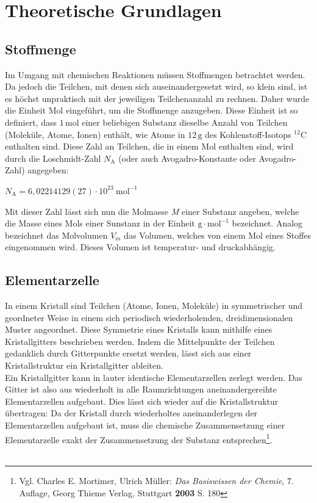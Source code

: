 \documentclass[12pt,a4paper,titlepage,headinclude,bibtotoc]{scrartcl}
\begin{document}
\tableofcontents

\newpage

\section{Theoretische Grundlagen}
\subsection{Stoffmenge}
Im Umgang mit chemischen Reaktionen müssen Stoffmengen betrachtet werden. Da jedoch die Teilchen, mit denen sich auseinandergesetzt wird, so klein sind, ist es höchst unpraktisch mit der jeweiligen Teilchenanzahl zu rechnen. Daher wurde die Einheit Mol eingeführt, um die Stoffmenge anzugeben. Diese Einheit ist so definiert, dass $ \mathrm{1\,mol}$ einer beliebigen Substanz dieselbe Anzahl von Teilchen (Moleküle, Atome, Ionen) enthält, wie Atome in $\mathrm{12\,g}$ des Kohlenstoff-Isotops $\mathrm{^{12}C}$ enthalten sind. Diese Zahl an Teilchen, die in einem Mol enthalten sind, wird durch die Loschmidt-Zahl $N_\mathrm{A}$ (oder auch Avogadro-Konstante oder Avogadro-Zahl) angegeben:\\

\begin{center}
$N_\mathrm{A}=6,02214129(27)\cdot 10^{23}\ \mathrm{mol^{-1}}$ 
\end{center}

Mit dieser Zahl lässt sich nun die Molmasse \textit{M} einer Substanz angeben, welche die Masse eines Mols einer Sunstanz in der Einheit $ \mathrm{g \cdot mol^{-1}}$ bezeichnet. Analog bezeichnet das Molvolumen $V_{m}$ das Volumen, welches von einem Mol eines Stoffes eingenommen wird. Dieses Volumen ist temperatur- und druckabhängig.

\subsection{Elementarzelle}
In einem Kristall sind Teilchen (Atome, Ionen, Moleküle) in symmetrischer und geordneter Weise in einem sich periodisch wiederholenden, dreidimensionalen Muster angeordnet. Diese Symmetrie eines Kristalls kann mithilfe eines Kristallgitters beschrieben werden. Indem die Mittelpunkte der Teilchen gedanklich durch Gitterpunkte ersetzt werden, lässt sich aus einer Kristallstruktur ein Kristallgitter ableiten.\\

Ein Kristallgitter kann in lauter identische Elementarzellen zerlegt werden. Das Gitter ist also aus wiederholt in alle Raumrichtungen aneinandergereihte Elementarzellen aufgebaut. Dies lässt sich wieder auf die Kristallstruktur übertragen: Da der Kristall durch wiederholtes aneinanderlegen der Elementarzellen aufgebaut ist, muss die chemische Zusammensetzung einer Elementarzelle exakt der Zusammensetzung der Substanz entsprechen\footnote{Vgl. Charles E. Mortimer, Ulrich Müller: \emph{Das Basiswissen der Chemie}, 7. Auflage, Georg Thieme Verlag, Stuttgart \textbf{2003} S. 180}.\\\\
\end{document}

